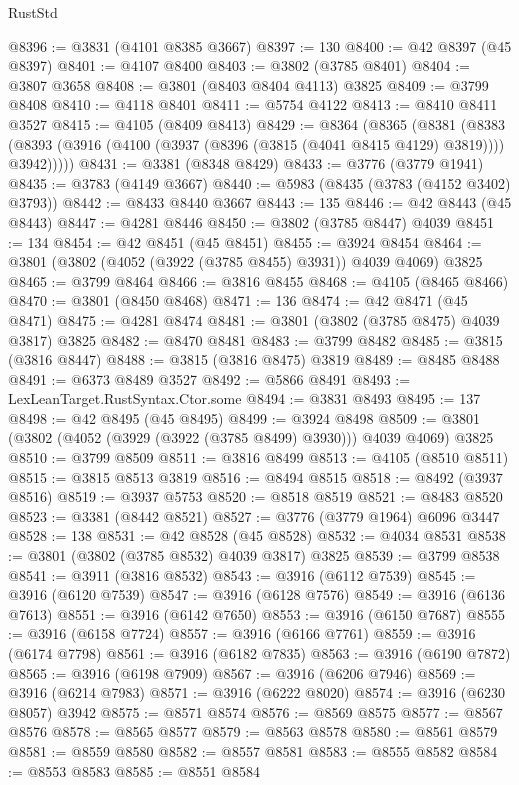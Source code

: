 \begin{lexlean}{RustStd}
\begin{coremodule}
@8396 := @3831 (@4101 @8385 @3667)
@8397 := 130
@8400 := @42 @8397 (@45 @8397)
@8401 := @4107 @8400
@8403 := @3802 (@3785 @8401)
@8404 := @3807 @3658
@8408 := @3801 (@8403 @8404 @4113) @3825
@8409 := @3799 @8408
@8410 := @4118 @8401
@8411 := @5754 @4122
@8413 := @8410 @8411 @3527
@8415 := @4105 (@8409 @8413)
@8429 := @8364
    (@8365
      (@8381
        (@8383 (@8393 (@3916 (@4100 (@3937 (@8396 (@3815 (@4041 @8415 @4129) @3819)))) @3942)))))
@8431 := @3381 (@8348 @8429)
@8433 := @3776 (@3779 @1941)
@8435 := @3783 (@4149 @3667)
@8440 := @5983 (@8435 (@3783 (@4152 @3402) @3793))
@8442 := @8433 @8440 @3667
@8443 := 135
@8446 := @42 @8443 (@45 @8443)
@8447 := @4281 @8446
@8450 := @3802 (@3785 @8447) @4039
@8451 := 134
@8454 := @42 @8451 (@45 @8451)
@8455 := @3924 @8454
@8464 := @3801 (@3802 (@4052 (@3922 (@3785 @8455) @3931)) @4039 @4069) @3825
@8465 := @3799 @8464
@8466 := @3816 @8455
@8468 := @4105 (@8465 @8466)
@8470 := @3801 (@8450 @8468)
@8471 := 136
@8474 := @42 @8471 (@45 @8471)
@8475 := @4281 @8474
@8481 := @3801 (@3802 (@3785 @8475) @4039 @3817) @3825
@8482 := @8470 @8481
@8483 := @3799 @8482
@8485 := @3815 (@3816 @8447)
@8488 := @3815 (@3816 @8475) @3819
@8489 := @8485 @8488
@8491 := @6373 @8489 @3527
@8492 := @5866 @8491
@8493 := LexLeanTarget.RustSyntax.Ctor.some
@8494 := @3831 @8493
@8495 := 137
@8498 := @42 @8495 (@45 @8495)
@8499 := @3924 @8498
@8509 := @3801 (@3802 (@4052 (@3929 (@3922 (@3785 @8499) @3930))) @4039 @4069) @3825
@8510 := @3799 @8509
@8511 := @3816 @8499
@8513 := @4105 (@8510 @8511)
@8515 := @3815 @8513 @3819
@8516 := @8494 @8515
@8518 := @8492 (@3937 @8516)
@8519 := @3937 @5753
@8520 := @8518 @8519
@8521 := @8483 @8520
@8523 := @3381 (@8442 @8521)
@8527 := @3776 (@3779 @1964) @6096 @3447
@8528 := 138
@8531 := @42 @8528 (@45 @8528)
@8532 := @4034 @8531
@8538 := @3801 (@3802 (@3785 @8532) @4039 @3817) @3825
@8539 := @3799 @8538
@8541 := @3911 (@3816 @8532)
@8543 := @3916 (@6112 @7539)
@8545 := @3916 (@6120 @7539)
@8547 := @3916 (@6128 @7576)
@8549 := @3916 (@6136 @7613)
@8551 := @3916 (@6142 @7650)
@8553 := @3916 (@6150 @7687)
@8555 := @3916 (@6158 @7724)
@8557 := @3916 (@6166 @7761)
@8559 := @3916 (@6174 @7798)
@8561 := @3916 (@6182 @7835)
@8563 := @3916 (@6190 @7872)
@8565 := @3916 (@6198 @7909)
@8567 := @3916 (@6206 @7946)
@8569 := @3916 (@6214 @7983)
@8571 := @3916 (@6222 @8020)
@8574 := @3916 (@6230 @8057) @3942
@8575 := @8571 @8574
@8576 := @8569 @8575
@8577 := @8567 @8576
@8578 := @8565 @8577
@8579 := @8563 @8578
@8580 := @8561 @8579
@8581 := @8559 @8580
@8582 := @8557 @8581
@8583 := @8555 @8582
@8584 := @8553 @8583
@8585 := @8551 @8584

\end{coremodule}
\end{lexlean}
